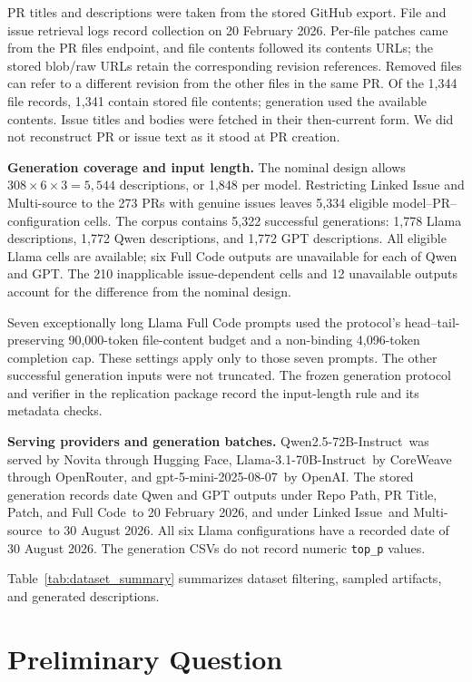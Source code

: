 \documentclass[11pt,a4paper]{article}
\newcommand{\proprietaryLLM}{gpt-5-mini-2025-08-07}
\newcommand{\openSourceLLMOne}{Llama-3.1-70B-Instruct}
\newcommand{\openSourceLLMTwo}{Qwen2.5-72B-Instruct}
\newcommand{\FileCont}{Full Code}
\newcommand{\LinkedIssues}{Linked Issue}
\newcommand{\WithoutFileContents}{Multi-source}
\begin{document}
PR titles and descriptions were taken from the stored GitHub export. File and issue retrieval logs record collection on 20 February 2026. Per-file patches came from the PR files endpoint, and file contents followed its contents URLs; the stored blob/raw URLs retain the corresponding revision references. Removed files can refer to a different revision from the other files in the same PR. Of the 1,344 file records, 1,341 contain stored file contents; generation used the available contents. Issue titles and bodies were fetched in their then-current form. We did not reconstruct PR or issue text as it stood at PR creation.

\textbf{Generation coverage and input length.}
The nominal design allows $308\times6\times3=5,544$ descriptions, or 1,848 per model. Restricting Linked Issue and Multi-source to the 273 PRs with genuine issues leaves 5,334 eligible model--PR--configuration cells. The corpus contains 5,322 successful generations: 1,778 Llama descriptions, 1,772 Qwen descriptions, and 1,772 GPT descriptions. All eligible Llama cells are available; six Full Code outputs are unavailable for each of Qwen and GPT. The 210 inapplicable issue-dependent cells and 12 unavailable outputs account for the difference from the nominal design.

Seven exceptionally long Llama Full Code prompts used the protocol's head--tail-preserving 90,000-token file-content budget and a non-binding 4,096-token completion cap. These settings apply only to those seven prompts. The other successful generation inputs were not truncated. The frozen generation protocol and verifier in the replication package record the input-length rule and its metadata checks.

\textbf{Serving providers and generation batches.}
\openSourceLLMTwo~was served by Novita through Hugging Face, \openSourceLLMOne~by CoreWeave through OpenRouter, and \proprietaryLLM~by OpenAI. The stored generation records date Qwen and GPT outputs under Repo Path, PR Title, Patch, and \FileCont~to 20 February 2026, and under \LinkedIssues~and \WithoutFileContents~to 30 August 2026. All six Llama configurations have a recorded date of 30 August 2026. The generation CSVs do not record numeric \texttt{top\_p} values.

Table~\ref{tab:dataset_summary} summarizes dataset filtering, sampled artifacts, and generated descriptions.



\section{Preliminary Question}
\end{document}

